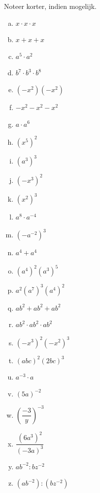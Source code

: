 \documentclass[12pt,twoside,a4paper]{article}
\begin{document}
\begin{oefening}
Noteer korter, indien mogelijk.
\begin{multicols}{3}
  \begin{enumerate}[(a)]
    \itemsep1em
    \item $x\cdot x\cdot x$
    \item $x+x+x$
    \item $a^5\cdot a^2$
    \item $b^7\cdot b^3\cdot b^8$
    \item $\left(-x^2\right)\left(-x^2\right)$
    \item $-x^2-x^2-x^2$
    \item $a\cdot a^6$
    \item $\left(x^5\right)^2$
    \item $\left(a^3\right)^3$
    \item $\left(-x^3\right)^2$
    \item $\left(x^2\right)^3$
    \item $a^8\cdot a^{-4}$
    \item $\left(-a^{-2}\right)^3$
    \item $a^4+a^4$
    \item $\left(a^4\right)^2\left(a^3\right)^5$
    \item $a^2\left(a^7\right)^3\left(a^4\right)^2$
    \item $ab^2+ab^2+ab^2$
    \item $ab^2\cdot ab^2\cdot ab^2$
    \item $\left(-x^3\right)^2\left(-x^2\right)^3$
    \item $\left(abc\right)^2\left(2bc\right)^3$
    \item $a^{-3}\cdot a$
    \item $\left(5a\right)^{-2}$
    \item $\left(\dfrac{-3}{y}\right)^{-3}$
    \item $\dfrac{\left(6a^3\right)^2}{\left(-3a\right)^3}$
    \item $ab^{-2}:bz^{-2}$
    \item $(ab^{-2}):(bz^{-2})$
  \end{enumerate}
\end{multicols}
\end{oefening}
\end{document}
